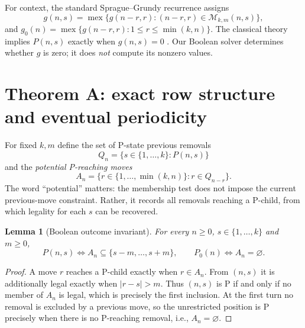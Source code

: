 \documentclass[11pt]{article}
\newtheorem{lemma}[theorem]{Lemma}
\DeclareMathOperator{\mex}{mex}
\newcommand{\K}{\{1,\ldots,k\}}
\begin{document}
For context, the standard Sprague--Grundy recurrence assigns
\begin{equation}\label{eq:grundy}
g(n,s)=\mex\{g(n-r,r):(n-r,r)\in\mathcal{M}_{k,m}(n,s)\},
\end{equation}
and $g_0(n)=\mex\{g(n-r,r):1\le r\le\min(k,n)\}$.
The classical theory implies $P(n,s)$ exactly when $g(n,s)=0$
\cite{sprague1935,grundy1939,winningways2001}.  Our Boolean solver determines
whether $g$ is zero; it does \emph{not} compute its nonzero values.

\section{Theorem A: exact row structure and eventual periodicity}
For fixed $k,m$ define the set of P-state previous removals
\[
Q_n=\{s\in\K:P(n,s)\}
\]
and the \emph{potential P-reaching moves}
\begin{equation}\label{eq:An}
A_n=\{r\in\{1,\ldots,\min(k,n)\}:r\in Q_{n-r}\}.
\end{equation}
The word ``potential'' matters: the membership test does not impose the
current previous-move constraint.  Rather, it records all removals reaching a
P-child, from which legality for each $s$ can be recovered.

\begin{lemma}[Boolean outcome invariant]\label{lem:invariant}
For every $n\ge0$, $s\in\K$ and $m\ge0$,
\begin{equation}\label{eq:invariant}
P(n,s)\iff A_n\subseteq\{s-m,\ldots,s+m\},
\qquad
P_0(n)\iff A_n=\varnothing.
\end{equation}
\end{lemma}
\begin{proof}
A move $r$ reaches a P-child exactly when $r\in A_n$.
From $(n,s)$ it is additionally legal exactly when $|r-s|>m$.
Thus $(n,s)$ is P if and only if no member of $A_n$ is legal,
which is precisely the first inclusion.  At the first turn no removal is
excluded by a previous move, so the unrestricted position is P precisely
when there is no P-reaching removal, i.e., $A_n=\varnothing$.
\end{proof}
\end{document}
